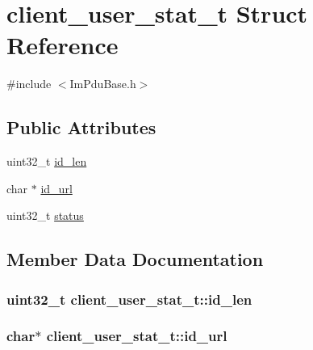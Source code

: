 \hypertarget{structclient__user__stat__t}{}\section{client\+\_\+user\+\_\+stat\+\_\+t Struct Reference}
\label{structclient__user__stat__t}


{\ttfamily \#include $<$Im\+Pdu\+Base.\+h$>$}

\subsection*{Public Attributes}
\begin{DoxyCompactItemize}
\item 
uint32\+\_\+t \hyperlink{structclient__user__stat__t_aa4dc25030c97304f4a05e5ba829a7871}{id\+\_\+len}
\item 
char $\ast$ \hyperlink{structclient__user__stat__t_acf942814d1edbb357174c2d25fe8f615}{id\+\_\+url}
\item 
uint32\+\_\+t \hyperlink{structclient__user__stat__t_a3e50c94161765b08270594d2f1338557}{status}
\end{DoxyCompactItemize}


\subsection{Member Data Documentation}
\hypertarget{structclient__user__stat__t_aa4dc25030c97304f4a05e5ba829a7871}{}
\subsubsection[{id\+\_\+len}]{\setlength{\rightskip}{0pt plus 5cm}uint32\+\_\+t client\+\_\+user\+\_\+stat\+\_\+t\+::id\+\_\+len}\label{structclient__user__stat__t_aa4dc25030c97304f4a05e5ba829a7871}
\hypertarget{structclient__user__stat__t_acf942814d1edbb357174c2d25fe8f615}{}
\subsubsection[{id\+\_\+url}]{\setlength{\rightskip}{0pt plus 5cm}char$\ast$ client\+\_\+user\+\_\+stat\+\_\+t\+::id\+\_\+url}\label{structclient__user__stat__t_acf942814d1edbb357174c2d25fe8f615}
\hypertarget{structclient__user__stat__t_a3e50c94161765b08270594d2f1338557}{}
